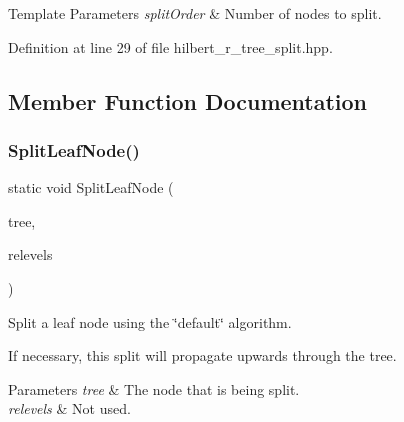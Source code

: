 \begin{DoxyTemplParams}{Template Parameters}
{\em split\+Order} & Number of nodes to split. \\
\hline
\end{DoxyTemplParams}


Definition at line 29 of file hilbert\+\_\+r\+\_\+tree\+\_\+split.\+hpp.



\subsection{Member Function Documentation}
\mbox{\label{classmlpack_1_1tree_1_1HilbertRTreeSplit_af73652d9536a1715364bbb0e4a9ba04e}} 
\subsubsection{Split\+Leaf\+Node()}
{\footnotesize\ttfamily static void Split\+Leaf\+Node (\begin{DoxyParamCaption}\item[{Tree\+Type $\ast$}]{tree,  }\item[{std\+::vector$<$ bool $>$ \&}]{relevels }\end{DoxyParamCaption})\hspace{0.3cm}{\ttfamily [static]}}



Split a leaf node using the \char`\"{}default\char`\"{} algorithm. 

If necessary, this split will propagate upwards through the tree.


\begin{DoxyParams}{Parameters}
{\em tree} & The node that is being split. \\
\hline
{\em relevels} & Not used. \\
\hline
\end{DoxyParams}
\mbox{\label{classmlpack_1_1tree_1_1HilbertRTreeSplit_a73ff1eaa94449d763847fff1f537922f}} 
